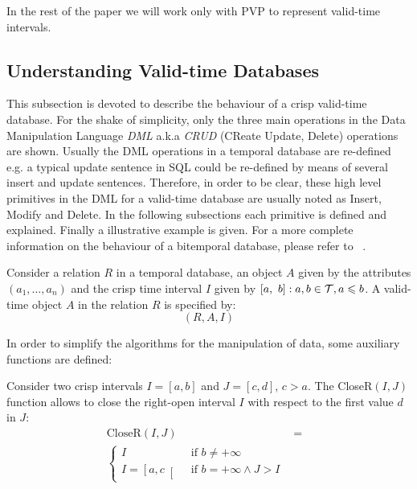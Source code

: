 In the rest of the paper we will work only with PVP to represent valid-time intervals.


\subsection{Understanding Valid-time Databases}
This subsection is devoted to describe the behaviour of a crisp valid-time database. For the shake of simplicity, only the three main operations in the Data Manipulation Language \emph{DML} a.k.a \emph{CRUD} (CReate Update, Delete) operations are shown. Usually the DML operations in a temporal database are re-defined e.g. a typical update sentence in SQL could be re-defined by means of several insert and update sentences. Therefore, in order to be clear, these high level primitives in the DML for a valid-time database are usually noted as Insert, Modify and Delete. In the following subsections each primitive is defined and explained. Finally a illustrative example is given. For a more complete information on the behaviour of a bitemporal database, please refer to ~\cite{Jensen1994}.

\begin{definition}
Consider a relation $R$ in a temporal database, an object $A$ given by the attributes $\left(a_1, \ldots, a_n \right)$ and the crisp time interval $I$ given by $\left[a,\ b\right] : a,b \in \mathcal{T}, a \leqslant b$. A valid-time object $A$ in the relation $R$ is specified by:
\begin{equation}
\label{eq:rel-def}
\left( R, A , I \right)
\end{equation}
\end{definition}

In order to simplify the algorithms for the manipulation of data, some auxiliary functions are defined:

\begin{definition}
\label{def:close-a-crisp-interval-r}
Consider two crisp intervals $I= \left[a ,b \right]$ and $J= \left[c ,d \right]$, $c > a$. The CloseR$\left(I, J\right)$ function allows to close the right-open interval $I$ with respect to the first value $d$ in $J$:
\begin{align}
\mbox{CloseR} \left( I, J \right) &=& \\ 
\begin{cases}
\nonumber
I & \mbox{ if } b \neq +\infty \\
I=\left[a, c \right[ & \mbox{ if } b = +\infty \wedge J > I
\end{cases}
\end{align}
\end{definition}

